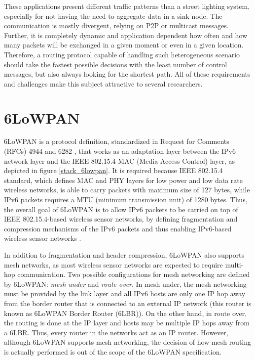 \documentclass[final,authoryear,3p,twocolumn]{elsarticle}
\begin{document}
These applications present different traffic patterns than a street lighting system, especially for not having the need to aggregate data in a sink node. The communication is mostly divergent, relying on P2P or multicast messages. Further, it is completely dynamic and application dependent how often and how many packets will be exchanged in a given moment or even in a given location. Therefore, a routing protocol capable of handling such heterogeneous scenario should take the fastest possible decisions with the least number of control messages, but also always looking for the shortest path. All of these requirements and challenges make this subject attractive to several researchers.

\section{6LoWPAN}
\label{sec6LoWPAN}

6LoWPAN is a protocol definition, standardized in Request for Comments (RFCs) 4944 and 6282 \citep{RFC4944,RFC6282}, that works as an adaptation layer between the IPv6 network layer and the IEEE 802.15.4 MAC (Media Access Control) layer, as depicted in figure \ref{stack_6lowpan}. It is required because IEEE 802.15.4 standard, which defines MAC and PHY layers for low power and low data rate wireless networks, is able to carry packets with maximum size of 127 bytes, while IPv6 packets requires a MTU (minimum transmission unit) of 1280 bytes. Thus, the overall goal of 6LoWPAN is to allow IPv6 packets to be carried on top of IEEE 802.15.4-based wireless sensor networks, by defining fragmentation and compression mechanisms of the IPv6 packets and thus enabling IPv6-based wireless sensor networks \citep{Mulligan_6LoWPAN_2007}.

In addition to fragmentation and header compression, 6LoWPAN also supports mesh networks, as most wireless sensor networks are expected to require multi-hop communication. Two possible configurations for mesh networking are defined by 6LoWPAN: \textit{mesh under} and \textit{route over}. In mesh under, the mesh networking must be provided by the link layer and all IPv6 hosts are only one IP hop away from the border router that is connected to an external IP network (this router is known as 6LoWPAN Border Router (6LBR)). On the other hand, in route over, the routing is done at the IP layer and hosts may be multiple IP hops away from a 6LBR. Thus, every router in the networks act as an IP router. However, although 6LoWPAN supports mesh networking, the decision of how mesh routing is actually performed is out of the scope of the 6LoWPAN specification.
\end{document}
